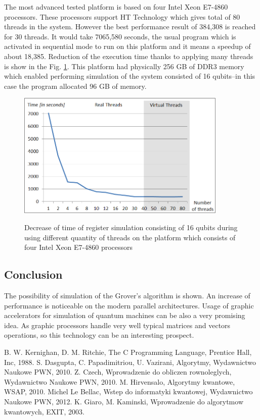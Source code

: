 \documentclass[10pt, a5paper]{article}
\begin{document}
The most advanced tested platform is based on four Intel Xeon E7-4860 processors. These processors support HT Technology which gives total of 80 threads in the system. However the best performance result of 384,308 is reached for 30 threads. It would take 7065,580 seconds, the usual program which is activated in sequential mode to run on this platform and it means a speedup of about 18,385. Reduction of the execution time thanks to applying many threads is show in the Fig. \ref{lf3}. This platform had physically 256 GB of DDR3 memory which enabled performing simulation of the system consisted of 16 qubits--in this case the program allocated 96 GB of memory.

\begin{figure}
  \centering
  \includegraphics[width=10cm]{18_2012_3b.png}
\label{lf3}
\caption{Decrease of time of register simulation consisting of 16 qubits during using different quantity of threads on the platform which consists of four  Intel Xeon E7-4860 processors}
\end{figure}

\subsection*{Conclusion}

The possibility of simulation of the Grover's algorithm is shown. An increase of performance is noticeable on the modern parallel architectures. Usage of graphic accelerators for simulation of quantum machines can be also a very promising idea. As graphic processors handle very well typical matrices and vectors operations, so this technology can be an interesting prospect.

\begin{thebibliography}{9}
   B. W. Kernighan, D. M. Ritchie, The C Programming Language, Prentice Hall, Inc, 1988.
   S. Dasgupta, C. Papadimitriou, U. Vazirani, Algorytmy, Wydawnictwo Naukowe PWN, 2010.
   Z. Czech, Wprowadzenie do obliczen rownoleglych, Wydawnictwo Naukowe PWN, 2010.
   M. Hirvensalo, Algorytmy kwantowe, WSAP, 2010.
   Michel Le Bellac, Wstep do informatyki kwantowej, Wydawnictwo Naukowe PWN, 2012.
   K. Giaro, M. Kaminski, Wprowadzenie do algorytmow kwantowych, EXIT, 2003.
\end{thebibliography}
\end{document}
